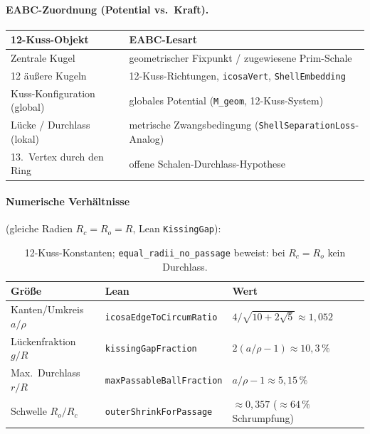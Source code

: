 \documentclass[11pt,a4paper]{article}
\begin{document}
	\paragraph{EABC-Zuordnung (Potential vs.\ Kraft).}
	\begin{center}
		\small
		\begin{tabular}{@{}ll@{}}
			\hline
			\textbf{12-Kuss-Objekt} & \textbf{EABC-Lesart} \\
			\hline
			Zentrale Kugel & geometrischer Fixpunkt / zugewiesene Prim-Schale \\
			12 äußere Kugeln & 12-Kuss-Richtungen, \texttt{icosaVert}, \texttt{ShellEmbedding} \\
			Kuss-Konfiguration (global) & globales Potential (\texttt{M\_geom}, 12-Kuss-System) \\
			Lücke / Durchlass (lokal) & metrische Zwangsbedingung (\texttt{ShellSeparationLoss}-Analog) \\
			13.\ Vertex durch den Ring & offene Schalen-Durchlass-Hypothese \\
			\hline
		\end{tabular}
	\end{center}
	
	\paragraph{Numerische Verhältnisse} (gleiche Radien $R_c=R_o=R$, Lean \texttt{KissingGap}):
	\begin{table}[h!]
		\centering
		\small
		\begin{tabular}{@{}lll@{}}
			\hline
			\textbf{Größe} & \textbf{Lean} & \textbf{Wert} \\
			\hline
			Kanten/Umkreis $a/\rho$ & \texttt{icosaEdgeToCircumRatio} & $4/\sqrt{10+2\sqrt5}\approx 1{,}052$ \\
			Lückenfraktion $g/R$ & \texttt{kissingGapFraction} & $2(a/\rho-1)\approx 10{,}3\,\%$ \\
			Max.\ Durchlass $r/R$ & \texttt{maxPassableBallFraction} & $a/\rho-1\approx 5{,}15\,\%$ \\
			Schwelle $R_o/R_c$ & \texttt{outerShrinkForPassage} & $\approx 0{,}357$ ($\approx 64\,\%$ Schrumpfung) \\
			\hline
		\end{tabular}
		\caption{12-Kuss-Konstanten; \texttt{equal\_radii\_no\_passage} beweist: bei $R_c=R_o$ kein Durchlass.}
		\label{tab:kissing-gap}
	\end{table}
	
\end{document}
